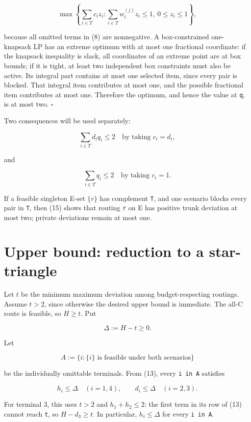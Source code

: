 \documentclass[
  11pt,
]{article}
\begin{document}
\[
\max\left\{
\sum_{i\in T}c_i z_i:
\sum_{i\in T}w_i^{(j)}z_i\le1,
\ 0\le z_i\le1
\right\},
\]

because all omitted terms in (8) are nonnegative. A box-constrained
one-knapsack LP has an extreme optimum with at most one fractional
coordinate: if the knapsack inequality is slack, all coordinates of an
extreme point are at box bounds; if it is tight, at least two
independent box constraints must also be active. Its integral part
contains at most one selected item, since every pair is blocked. That
integral item contributes at most one, and the possible fractional item
contributes at most one. Therefore the optimum, and hence the value at
\texttt{q}, is at most two. \(\square\)

Two consequences will be used separately:

\[
\sum_{i\in T}d_iq_i\le2
\quad\text{by taking }c_i=d_i,
\tag{15}
\]

and

\[
\sum_{i\in T}q_i\le2
\quad\text{by taking }c_i=1.
\tag{16}
\]

If a feasible singleton E-set \(\{r\}\) has complement \texttt{T}, and
one scenario blocks every pair in \texttt{T}, then (15) shows that
routing \texttt{r} on E has positive trunk deviation at most two;
private deviations remain at most one.

\section{Upper bound: reduction to a
star-triangle}\label{upper-bound-reduction-to-a-star-triangle}

Let \(t\) be the minimum maximum deviation among budget-respecting
routings. Assume \(t>2\), since otherwise the desired upper bound is
immediate. The all-C route is feasible, so \(H\ge t\). Put

\[
\Delta:=H-t\ge0.
\tag{17}
\]

Let

\[
A:=\{i:\{i\}\text{ is feasible under both scenarios}\}
\]

be the individually omittable terminals. From (13), every
\texttt{i\ in\ A} satisfies

\[
h_i\le\Delta\quad(i=1,4),
\qquad
d_i\le\Delta\quad(i=2,3).
\tag{18}
\]

For terminal 3, this uses \(t>2\) and \(h_1+h_2\le2\): the first term in
its row of (13) cannot reach \texttt{t}, so \(H-d_3\ge t\). In
particular, \(h_i\le\Delta\) for every \texttt{i\ in\ A}.
\end{document}
